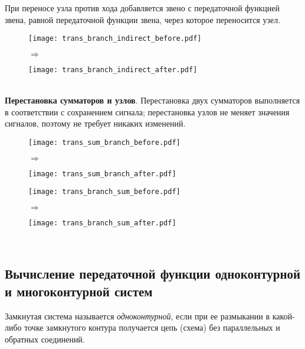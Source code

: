 \documentclass[../../TAU.tex]{subfiles}
\begin{document}
    При переносе узла против хода  добавляется звено с передаточной функцией звена, равной передаточной функции звена, через которое переносится узел. 
    \begin{figure}[h]
        \begin{minipage}[h]{0.45\linewidth}
            \texttt{[image: trans\_branch\_indirect\_before.pdf]}
        \end{minipage}
        $\Longrightarrow$
        \begin{minipage}[h]{0.45\linewidth}
            \texttt{[image: trans\_branch\_indirect\_after.pdf]}
        \end{minipage}
    \end{figure}\\
    {\bf Перестановка сумматоров и узлов}. Перестановка двух сумматоров выполняется в соответствии с сохранением сигнала; перестановка узлов не меняет значения сигналов, поэтому не требует никаких изменений.
    \begin{figure}[h]
        \begin{minipage}[h]{0.45\linewidth}
            \texttt{[image: trans\_sum\_branch\_before.pdf]}
        \end{minipage}
        $\Longrightarrow$
        \begin{minipage}[h]{0.45\linewidth}
            \texttt{[image: trans\_sum\_branch\_after.pdf]}
        \end{minipage}
        \begin{minipage}[h]{0.45\linewidth}
            \texttt{[image: trans\_branch\_sum\_before.pdf]}
        \end{minipage}
    $\Longrightarrow$
        \begin{minipage}[h]{0.45\linewidth}
            \texttt{[image: trans\_branch\_sum\_after.pdf]}
        \end{minipage}
    \end{figure}\\

\subsection{Вычисление передаточной функции одноконтурной и многоконтурной систем}

     Замкнутая система называется {\it одноконтурной}, если при ее размыкании в какой-либо точке замкнутого контура получается цепь (схема) без параллельных и обратных соединений.
\end{document}
